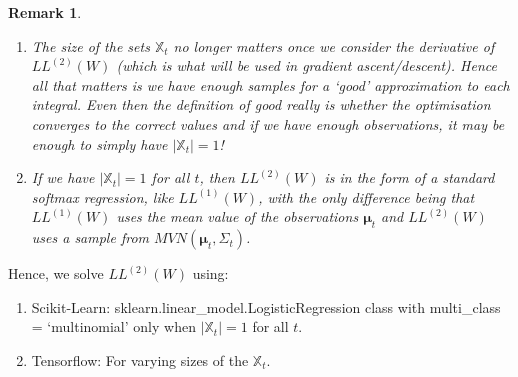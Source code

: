 \documentclass[
10pt, %
a4paper, %
oneside, %
headinclude,footinclude, %
BCOR5mm, %
]{scrartcl}
\newcommand{\bfmu}{\boldsymbol{\mu}}
\newtheorem{remark}{Remark}
\begin{document}
\begin{remark}
\begin{enumerate}
  \item The size of the sets $\mathbb{X}_t$ no longer matters once we consider the derivative of $LL^{(2)}(W)$ (which is what will be used in gradient ascent/descent). Hence all that matters is we have enough samples for a `good' approximation to each integral. Even then the definition of good really is whether the optimisation converges to the correct values and if we have enough observations, it may be enough to simply have $| \mathbb{X}_t | = 1$!
  \item If we have $| \mathbb{X}_t | = 1 $ for all $t$, then $LL^{(2)}(W)$ is in the form of a standard softmax regression, like $LL^{(1)}(W)$, with the only difference being that $LL^{(1)}(W)$ uses the mean value of the observations $\bfmu_t$ and $LL^{(2)}(W)$ uses a sample from $MVN(\bfmu_t, \Sigma_t)$.
\end{enumerate}
\end{remark}

Hence, we solve $LL^{(2)}(W)$ using:
\begin{enumerate}
  \item Scikit-Learn: sklearn.linear\_model.LogisticRegression class with multi\_class = `multinomial' only when $| \mathbb{X}_t | = 1$ for all $t$.
  \item Tensorflow: For varying sizes of the $\mathbb{X}_t $.
\end{enumerate}



\renewcommand{\refname}{\spacedlowsmallcaps{References}} %




\end{document}
